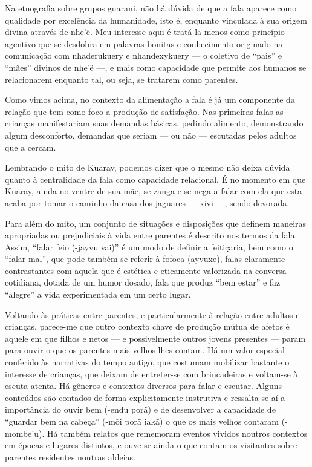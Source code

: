 Na etnografia sobre grupos guarani, não há dúvida de que a fala aparece
como qualidade por excelência da humanidade, isto é, enquanto vinculada
à sua origem divina através de nhe’ë. Meu interesse aqui é tratá-la
menos como princípio agentivo que se desdobra em palavras bonitas e
conhecimento originado na comunicação com nhaderukuery e nhandexykuery
— o coletivo de ``pais'' e ``mães'' divinos de nhe’ë —, e mais como
capacidade que permite aos humanos se relacionarem enquanto tal, ou
seja, se tratarem como parentes.

Como vimos acima, no contexto da alimentação a fala é já um componente
da relação que tem como foco a produção de satisfação. Nas primeiras
falas as crianças manifestariam suas demandas básicas, pedindo
alimento, demonstrando algum desconforto, demandas que seriam — ou não
— escutadas pelos adultos que a cercam. 

Lembrando o mito de Kuaray, podemos dizer que o mesmo não deixa dúvida
quanto à centralidade da fala como capacidade relacional. É no momento
em que Kuaray, ainda no ventre de sua mãe, se zanga e se nega a falar
com ela que esta acaba por tomar o caminho da casa dos jaguares — xivi
—, sendo devorada.

Para além do mito, um conjunto de situações e disposições que definem
maneiras apropriadas ou prejudiciais à vida entre parentes é descrito
nos termos da fala. Assim, ``falar feio (-jayvu vai)'' é um modo de
definir a feitiçaria, bem como o ``falar mal'', que pode também se
referir à fofoca (ayvuxe), falas claramente contrastantes com aquela
que é estética e eticamente valorizada na conversa cotidiana, dotada de
um humor dosado, fala que produz ``bem estar'' e faz ``alegre'' a vida
experimentada em um certo lugar.

Voltando às práticas entre parentes, e particularmente à relação entre
adultos e crianças, parece-me que outro contexto chave de produção
mútua de afetos é aquele em que filhos e netos — e possivelmente outros
jovens presentes — param para ouvir o que os parentes mais velhos lhes
contam. Há um valor especial conferido às narrativas do tempo antigo,
que costumam mobilizar bastante o interesse de crianças, que deixam de
entreter-se com brincadeiras e voltam-se à escuta atenta. Há gêneros e
contextos diversos para falar-e-escutar. Alguns conteúdos são contados
de forma explicitamente instrutiva e ressalta-se aí a importância do
ouvir bem (-endu porã) e de desenvolver a capacidade de ``guardar bem na
cabeça'' (-mõi porã iakã) o que os mais velhos contaram (-mombe’u). Há
também relatos que rememoram eventos vividos noutros contextos em
épocas e lugares distintos, e ouve-se ainda o que contam os visitantes
sobre parentes residentes noutras aldeias.

